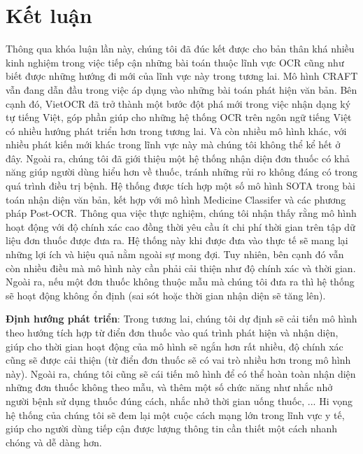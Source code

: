 \chapter{Kết luận}
\label{Chapter6}
Thông qua khóa luận lần này, chúng tôi đã đúc kết được cho bản thân khá nhiều kinh nghiệm trong việc tiếp cận những bài toán thuộc lĩnh vực OCR cũng như biết được những hướng đi mới của lĩnh vực này trong tương lai. Mô hình CRAFT \cite{baek2019character} vẫn đang dẫn đầu trong việc áp dụng vào những bài toán phát hiện văn bản. Bên cạnh đó, VietOCR \cite{VietOCR} đã trở thành một bước đột phá mới trong việc nhận dạng ký tự tiếng Việt, góp phần giúp cho những hệ thống OCR trên ngôn ngữ tiếng Việt có nhiều hướng phát triển hơn trong tương lai. Và còn nhiều mô hình khác, với nhiều phát kiến mới khác trong lĩnh vực này mà chúng tôi không thể kể hết ở đây. Ngoài ra, chúng tôi đã giới thiệu một hệ thống nhận diện đơn thuốc có khả năng giúp người
dùng hiểu hơn về thuốc, tránh những rủi ro không đáng có trong quá trình điều trị
bệnh. Hệ thống được tích hợp một số mô hình SOTA trong bài toán nhận diện văn bản, kết
hợp với mô hình Medicine Classifer và các phương pháp Post-OCR. Thông qua việc thực nghiệm, chúng tôi nhận thấy rằng mô hình hoạt động với độ chính xác cao đồng thời yêu
cầu ít chi phí thời gian trên tập dữ liệu đơn thuốc được đưa ra. Hệ thống này khi được đưa
vào thực tế sẽ mang lại những lợi ích và hiệu quả nằm ngoài sự mong đợi. Tuy nhiên, bên
cạnh đó vẫn còn nhiều điều mà mô hình này cần phải cải thiện như độ chính xác và thời
gian. Ngoài ra, nếu một đơn thuốc không thuộc mẫu mà chúng tôi đưa ra thì hệ thống sẽ
hoạt động không ổn định (sai sót hoặc thời gian nhận diện sẽ tăng lên).

\textbf{Định hướng phát triển}: Trong tương lai, chúng tôi dự định sẽ cải tiến mô hình theo hướng
tích hợp từ điển đơn thuốc vào quá trình phát hiện và nhận diện, giúp cho thời gian hoạt
động của mô hình sẽ ngắn hơn rất nhiều, độ chính xác cũng sẽ được cải thiện (từ điển đơn
thuốc sẽ có vai trò nhiều hơn trong mô hình này). Ngoài ra, chúng tôi cũng sẽ cái tiến mô
hình để có thể hoàn toàn nhận diện những đơn thuốc không theo mẫu, và thêm một số chức
năng như nhắc nhở người bệnh sử dụng thuốc đúng cách, nhắc nhở thời gian uống thuốc,
... Hi vọng hệ thống của chúng tôi sẽ đem lại một cuộc cách mạng lớn trong lĩnh vực y tế,
giúp cho người dùng tiếp cận được lượng thông tin cần thiết một cách nhanh chóng và dễ
dàng hơn.